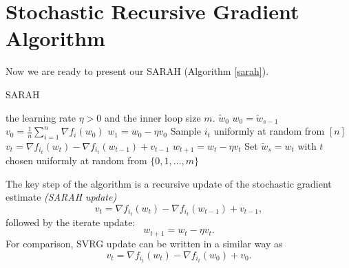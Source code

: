 \documentclass{article}
\newcommand{\tc}[1]{\textcolor{Magenta}{\bf #1}}
\newcommand{\setn}{[n]}
\begin{document}

\section{Stochastic Recursive Gradient Algorithm} 

Now we are ready to present our SARAH (Algorithm \ref{sarah}).

\begin{algorithm}%
   \caption{SARAH}
   \label{sarah}
\begin{algorithmic}
    the learning rate $\eta > 0$ and the inner loop size $m$.
    $\tilde{w}_0$
   \STATE $w_0 = \tilde{w}_{s-1}$
   \STATE $v_0 = \frac{1}{n}\sum_{i=1}^{n} \nabla f_i(w_0)$
   \STATE $w_1 = w_0 - \eta v_0$
   \STATE Sample $i_{t}$ uniformly at random from $\setn$
   \STATE $v_{t} = \nabla f_{i_{t}} (w_{t}) - \nabla f_{i_{t}}(w_{t-1}) + v_{t-1}$
   \STATE $w_{t+1} = w_{t} - \eta v_{t}$
   \ENDFOR
   \STATE Set $\tilde{w}_s = w_{t}$ with $t$ chosen uniformly at random from $\{0,1,\dots,m\}$
   \ENDFOR
\end{algorithmic}
\end{algorithm} 

The key step of the algorithm is a recursive update of the stochastic gradient estimate \textit{(SARAH update)}
\begin{equation}\label{eq:vt}
   v_{t} = \nabla f_{i_{t}} (w_{t}) - \nabla f_{i_{t}}(w_{t-1}) + v_{t-1},
\end{equation}
followed by the iterate update:
\begin{equation}\label{eq:iterate}
w_{t+1} = w_{t} - \eta v_{t}.
\end{equation}
For comparison, SVRG update can be written in a similar way as
\begin{equation}\label{eq:svrgvt}
   v_{t} = \nabla f_{i_{t}} (w_{t}) - \nabla f_{i_{t}}(w_{0}) + v_{0}. 
\end{equation}
\end{document}
